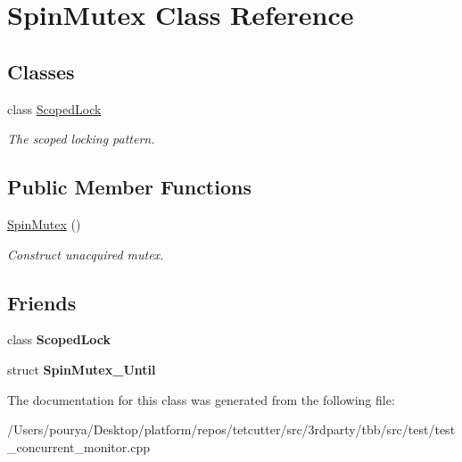 \hypertarget{classSpinMutex}{}\section{Spin\+Mutex Class Reference}
\label{classSpinMutex}
\subsection*{Classes}
\begin{DoxyCompactItemize}
\item 
class \hyperlink{classSpinMutex_1_1ScopedLock}{Scoped\+Lock}
\begin{DoxyCompactList}\small\item\em The scoped locking pattern. \end{DoxyCompactList}\end{DoxyCompactItemize}
\subsection*{Public Member Functions}
\begin{DoxyCompactItemize}
\item 
\hypertarget{classSpinMutex_a892b80f89725202553bb09439dbbe686}{}\hyperlink{classSpinMutex_a892b80f89725202553bb09439dbbe686}{Spin\+Mutex} ()\label{classSpinMutex_a892b80f89725202553bb09439dbbe686}

\begin{DoxyCompactList}\small\item\em Construct unacquired mutex. \end{DoxyCompactList}\end{DoxyCompactItemize}
\subsection*{Friends}
\begin{DoxyCompactItemize}
\item 
\hypertarget{classSpinMutex_a5058cdfb7df310bafdc226830d5acd0f}{}class {\bfseries Scoped\+Lock}\label{classSpinMutex_a5058cdfb7df310bafdc226830d5acd0f}

\item 
\hypertarget{classSpinMutex_a4594f802f5969118b4a9beed66a14605}{}struct {\bfseries Spin\+Mutex\+\_\+\+Until}\label{classSpinMutex_a4594f802f5969118b4a9beed66a14605}

\end{DoxyCompactItemize}


The documentation for this class was generated from the following file\+:\begin{DoxyCompactItemize}
\item 
/\+Users/pourya/\+Desktop/platform/repos/tetcutter/src/3rdparty/tbb/src/test/test\+\_\+concurrent\+\_\+monitor.\+cpp\end{DoxyCompactItemize}
